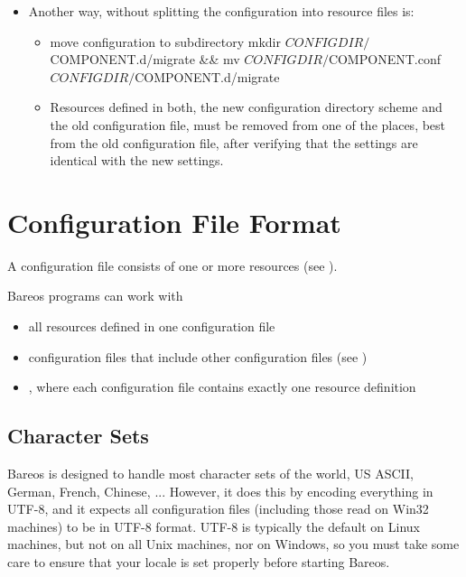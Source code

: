 \begin{itemize}
\begin{itemize}
\begin{commands}{bareos-migrate-config.sh}
# install newly generated configuration
cp -a /tmp/bareos-dir.d /etc/bareos/
        \end{commands}
        Restart the \bareosDir and verify your configuration.
        Also make sure, that all resource configuration files coming from Bareos packages exists, in doubt as empty files, see \hyperlink{sec:deleteConfigurationResourceFiles}{remove configuration resource files}.

    \item Another way, without splitting the configuration into resource files is:
        \begin{itemize}
        \item \begin{commands}{move configuration to subdirectory}
mkdir $CONFIGDIR/$COMPONENT.d/migrate && mv $CONFIGDIR/$COMPONENT.conf $CONFIGDIR/$COMPONENT.d/migrate
        \end{commands}
        \item Resources defined in both, the new configuration directory scheme
                    and the old configuration file, must be removed from one of the places,
                    best from the old configuration file,
                    after verifying that the settings are identical with the new settings.
        \end{itemize}
    \end{itemize}
\end{itemize}

\section{Configuration File Format}

A configuration file consists of one or more resources (see ).

Bareos programs can work with
\begin{itemize}
  \item all resources defined in one configuration file
  \item configuration files that include other configuration files (see )
  \item {}, where each configuration file contains exactly one resource definition
\end{itemize}



\subsection{Character Sets}
Bareos is designed to handle most character sets of the world,
US ASCII, German, French, Chinese, ...  However, it does this by
encoding everything in UTF-8, and it expects all configuration files
(including those read on Win32 machines) to be in UTF-8 format.
UTF-8 is typically the default on Linux machines, but not on all
Unix machines, nor on Windows, so you must take some care to ensure
that your locale is set properly before starting Bareos.


